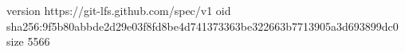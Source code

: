 version https://git-lfs.github.com/spec/v1
oid sha256:9f5b80abbde2d29e03f8fd8be4d741373363be322663b7713905a3d693899dc0
size 5566
